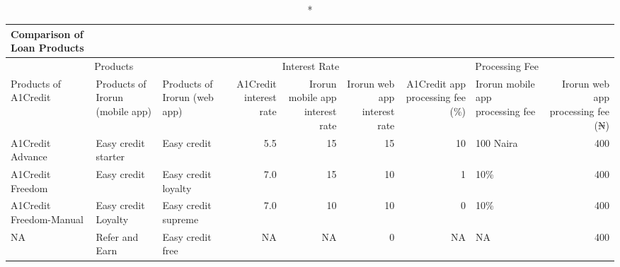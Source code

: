 \documentclass[
]{article}
\begin{document}
\begin{longtable}{lllrrrrlr}
\caption*{
{\large Comparison of Loan Products}
} \\ 
\toprule
\multicolumn{3}{c}{Products} & \multicolumn{3}{c}{Interest Rate} & \multicolumn{3}{c}{Processing Fee} \\ 
\cmidrule(lr){1-3} \cmidrule(lr){4-6} \cmidrule(lr){7-9}
Products of A1Credit & Products of Irorun (mobile app) & Products of Irorun (web app) & A1Credit interest rate & Irorun mobile app interest rate & Irorun web app interest rate & A1Credit app processing fee (\%) & Irorun mobile app processing fee & Irorun web app processing fee (₦) \\ 
\midrule
A1Credit Advance & Easy credit starter & Easy credit & 5.5 & 15 & 15 & 10 & 100 Naira & 400 \\ 
A1Credit Freedom & Easy credit & Easy credit loyalty & 7.0 & 15 & 10 & 1 & 10\% & 400 \\ 
A1Credit Freedom-Manual & Easy credit Loyalty & Easy credit supreme & 7.0 & 10 & 10 & 0 & 10\% & 400 \\ 
NA & Refer and Earn & Easy credit free & NA & NA & 0 & NA & NA & 400 \\ 
\bottomrule
\end{longtable}
\end{document}
